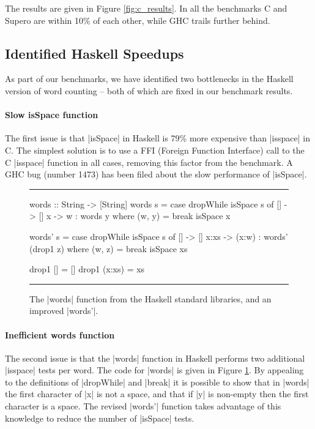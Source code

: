 \documentclass{llncs}
\newenvironment{fig}
    {\begin{figure}[tbp]\hrule}
    {\end{figure}}
\newcommand{\figend}{\hrule}
\newcommand{\perc}{\%
    }
\begin{document}
The results are given in Figure \ref{fig:c_results}. In all the benchmarks C and Supero are within 10\% of each other, while GHC trails further behind.

\subsection{Identified Haskell Speedups}

As part of our benchmarks, we have identified two bottlenecks in the Haskell version of word counting -- both of which are fixed in our benchmark results.

\paragraph{Slow \textsf{isSpace} function}

The first issue is that |isSpace| in Haskell is 79\perc more expensive than |isspace| in C. The simplest solution is to use a FFI (Foreign Function Interface) \cite{spj:awkward_squad} call to the C |isspace| function in all cases, removing this factor from the benchmark. A GHC bug (number 1473) has been filed about the slow performance of |isSpace|.

\begin{fig}
\begin{code}
words :: String -> [String]
words s = case  dropWhile isSpace s of
                []  ->  []
                x   ->  w : words y
                        where (w, y) = break isSpace x

words' s = case  dropWhile isSpace s of
                 []    ->  []
                 x:xs  ->  (x:w) : words' (drop1 z)
                           where (w, z) = break isSpace xs

drop1 []      = []
drop1 (x:xs)  = xs
\end{code}
\figend
\caption{The |words| function from the Haskell standard libraries, and an improved |words'|.}
\label{fig:words}
\end{fig}

\paragraph{Inefficient \textsf{words} function}

The second issue is that the |words| function in Haskell performs two additional |isspace| tests per word. The code for |words| is given in Figure \ref{fig:words}. By appealing to the definitions of |dropWhile| and |break| it is possible to show that in |words| the first character of |x| is not a space, and that if |y| is non-empty then the first character is a space. The revised |words'| function takes advantage of this knowledge to reduce the number of |isSpace| tests.
\end{document}
